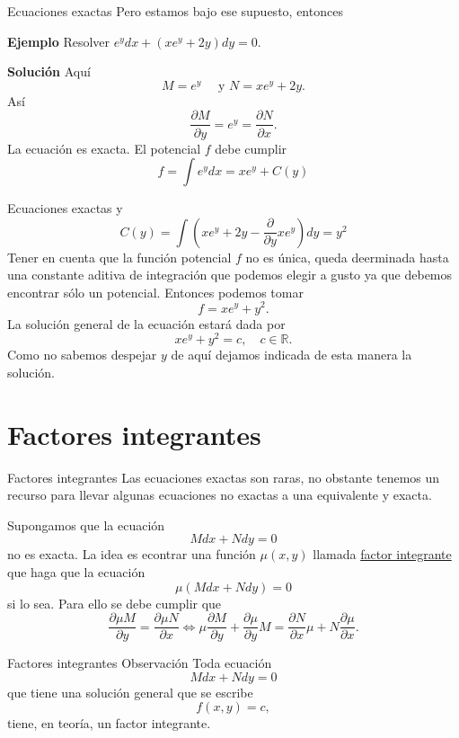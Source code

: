 \documentclass{article}
\newcommand{\rr}{\mathbb{R}}
\newcommand{\der}[2]{\frac{\partial #1}{\partial #2}}
\begin{document}
{Ecuaciones exactas}
 Pero estamos bajo ese supuesto, entonces

\textbf{Ejemplo} Resolver $e^ydx+(xe^y+2y)dy=0$. 

\textbf{Solución} Aquí
\[M=e^y\quad\text{ y }N=xe^y+2y.\]
Así
\[\der{M}{y}=e^y=\der{N}{x}.\]
La ecuación es exacta. El potencial $f$ debe cumplir
\[f=\int e^ydx=xe^y+C(y)\]





{Ecuaciones exactas}
y
\[C(y)=\int\left( xe^y+2y -\frac{\partial}{\partial y} xe^y\right)dy= y^2\]
Tener en cuenta que la función potencial $f$ no es única, queda deerminada hasta una constante aditiva de integración que podemos elegir a gusto ya que 
debemos encontrar sólo un potencial. Entonces podemos tomar
\[f= xe^y+y^2.\]
La solución general de la ecuación estará dada por
\[xe^y+y^2=c,\quad c\in\rr.\]
Como no sabemos despejar $\boxed{y}$ de aquí dejamos indicada de esta manera la solución.



\section{Factores integrantes}
{Factores integrantes}
 Las ecuaciones exactas son raras, no obstante tenemos un recurso para llevar algunas ecuaciones no exactas a una equivalente y exacta.

 Supongamos que la ecuación
\[Mdx+Ndy=0\]
no es  exacta. La idea es econtrar una función $\mu(x,y)$ llamada 
\href{http://es.wikipedia.org/wiki/Ecuación_diferencial_exacta\#Factor_integrante.}{factor integrante} que haga que la ecuación
\[\mu\left(Mdx+Ndy\right)=0\]
si lo sea. Para ello se debe cumplir que
\begin{equation}\label{carac_factor}
  \der{\mu M}{y}=\der{\mu N}{x}\Longleftrightarrow \boxed{ \mu\der{M}{y}+\der{\mu}{y}M=\der{N}{x}\mu+N\der{\mu}{x}}.
\end{equation}
 

 
 
{Factores integrantes}
 {Observación}
  Toda ecuación
  \begin{equation}\label{ec_no_exa}Mdx+Ndy=0
   \end{equation}
  que tiene una solución general que se escribe
  \begin{equation}\label{sol_ec_no_exa}
   f(x,y)=c,  
  \end{equation}
  tiene, en teoría, un factor integrante. 
 
\end{document}
